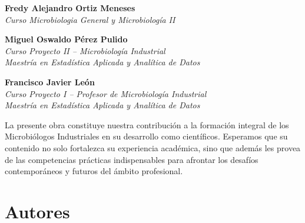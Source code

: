 \documentclass[
  spanish,
  letterpaper,
  DIV=11,
  numbers=noendperiod]{scrreprt}
\begin{document}
\textbf{Fredy Alejandro Ortiz Meneses}\\
\emph{Curso Microbiologia General y Microbiología II}

\textbf{Miguel Oswaldo Pérez Pulido}\\
\emph{Curso Proyecto II -- Microbiología Industrial\\
Maestría en Estadística Aplicada y Analítica de Datos}

\textbf{Francisco Javier León}\\
\emph{Curso Proyecto I -- Profesor de Microbiología Industrial\\
Maestría en Estadística Aplicada y Analítica de Datos}

\begin{tcolorbox}[enhanced jigsaw, titlerule=0mm, arc=.35mm, rightrule=.15mm, bottomrule=.15mm, leftrule=.75mm, colbacktitle=quarto-callout-tip-color!10!white, colframe=quarto-callout-tip-color-frame, coltitle=black, opacityback=0, colback=white, toptitle=1mm, opacitybacktitle=0.6, toprule=.15mm, bottomtitle=1mm, title=\textcolor{quarto-callout-tip-color}{\faLightbulb}\hspace{0.5em}{Lo que significa este libro}, left=2mm, breakable]

La presente obra constituye nuestra contribución a la formación integral
de los Microbiólogos Industriales en su desarrollo como científicos.
Esperamos que su contenido no solo fortalezca su experiencia académica,
sino que además les provea de las competencias prácticas indispensables
para afrontar los desafíos contemporáneos y futuros del ámbito
profesional.

\end{tcolorbox}


\chapter*{Autores}\label{autores}

\end{document}
